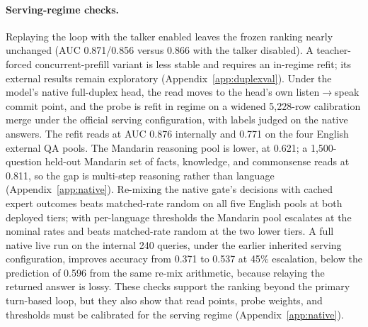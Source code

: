 \paragraph{Serving-regime checks.}
Replaying the loop with the talker enabled leaves the frozen ranking
nearly unchanged (AUC 0.871/0.856 versus 0.866 with the talker
disabled). A teacher-forced concurrent-prefill variant is less stable
and requires an in-regime refit; its external results remain
exploratory (Appendix~\ref{app:duplexval}). Under the model's native
full-duplex head, the read moves to the head's own listen$\to$speak
commit point, and the probe is refit in regime on a widened
5{,}228-row calibration merge under the official serving
configuration, with labels judged on the native answers. The refit
reads at AUC 0.876 internally and 0.771 on the four English external
QA pools. The Mandarin reasoning pool is lower, at 0.621; a
1{,}500-question held-out Mandarin set of facts, knowledge, and
commonsense reads at 0.811, so the gap is multi-step reasoning
rather than language (Appendix~\ref{app:native}). Re-mixing the
native gate's decisions with cached expert outcomes beats
matched-rate random on all five English pools at both deployed
tiers; with per-language thresholds the Mandarin pool escalates at
the nominal rates and beats matched-rate random at the two lower
tiers. A full native live run on the internal 240 queries, under the
earlier inherited serving configuration, improves accuracy from
0.371 to 0.537 at 45\% escalation, below the prediction of 0.596
from the same re-mix arithmetic, because relaying the returned
answer is lossy. These checks support the ranking beyond the primary
turn-based loop, but they also show that read points, probe weights,
and thresholds must be calibrated for the serving regime
(Appendix~\ref{app:native}).
